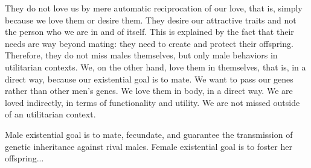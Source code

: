 \par They do not love us by mere automatic reciprocation of our love, that is, simply because we love them or desire them. They desire our attractive traits and not the person who we are in and of itself. This is explained by the fact that their needs are way beyond mating: they need to create and protect their offspring. Therefore, they do not miss males themselves, but only male behaviors in utilitarian contexts. We, on the other hand, love them in themselves, that is, in a direct way, because our existential goal is to mate. We want to pass our genes rather than other men's genes. We love them in body, in a direct way. We are loved indirectly, in terms of functionality and utility. We are not missed outside of an utilitarian context.

\par Male existential goal is to mate, fecundate, and guarantee the transmission of genetic inheritance against rival males. Female existential goal is to foster her offspring...